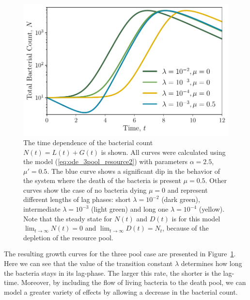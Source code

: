 \documentclass[10pt,twocolumn,5p]{elsarticle}
\numberwithin{equation}{section}
\begin{document}
\begin{figure}
    \begin{center}
    \includegraphics[width=0.9\columnwidth]{Figures/pool_model_3pools_resource.pdf}
    \caption{
        The time dependence of the bacterial count $N(t) = L(t) + G(t) $ is shown.
        All curves were calculated using the model (\ref{eq:ode_3pool_resource2}) with parameters $\alpha=2.5$, $\mu'=0.5$.
        The blue curve shows a significant dip in the behavior of the system where the death of the bacteria is present $\mu = 0.5$.
        Other curves show the case of no bacteria dying $\mu=0$ and represent different lengths of lag phases: short $\lambda=10^{-2}$ (dark green), intermediate $\lambda=10^{-3}$ (light green) and long one $\lambda=10^{-4}$ (yellow). Note that the steady state for $N(t)$ and $D(t)$ is for this model $\lim_{t\to\infty} N(t)=0$ and $\lim_{t\to\infty} D(t)=N_t$, because of the depletion of the resource pool. 
    }
    \label{fig:3pool_resource_plots}
    \end{center}
\end{figure}
The resulting growth curves for the three pool case are presented in Figure~\ref{fig:3pool_resource_plots}.
Here we can see that the value of the transition constant $\lambda$ determines how long the bacteria stays in its lag-phase.
The larger this rate, the shorter is the lag-time.
Moreover, by including the flow of living bacteria to the death pool, we can model a greater variety of effects by allowing a decrease in the bacterial count.
%
%
\end{document}
